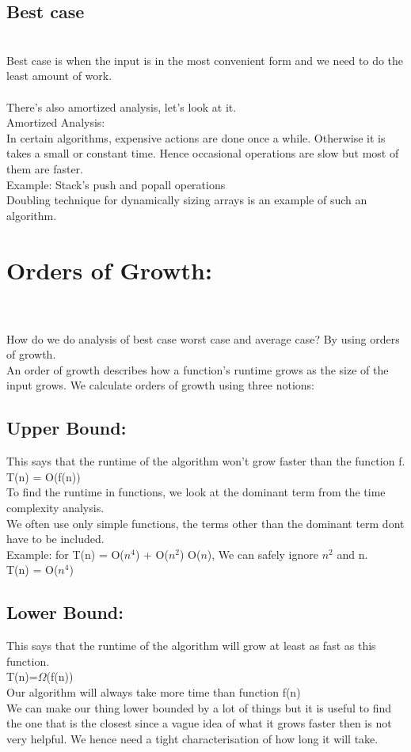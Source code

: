 \subsection{Best case}
\\ Best case is when the input is in the most convenient form and we need to do the least amount of work.
\\ 
\\There's also amortized analysis, let's look at it.
\\Amortized Analysis:
\\In certain algorithms, expensive actions are done once a while. Otherwise it is takes a small or constant time. Hence occasional operations are slow but most of them are faster.
\\Example: Stack's push and popall operations
\\Doubling technique for dynamically sizing arrays is an example of such an algorithm. 



\section{Orders of Growth:}
\\\\How do we do analysis of best case worst case and average case? By using orders of growth.
\\An order of growth describes how a function's runtime grows as the size of the input grows. We calculate orders of growth using three notions:
\subsection{Upper Bound:} This says that the runtime of the algorithm won't grow faster than the function f.
\\	T(n) = O(f(n))
\\	To find the runtime in functions, we look at the dominant term from the time complexity analysis.
\\	We often use only simple functions, the terms other than the dominant term dont have to be included.
\\ Example: for T(n) = O($n^4$) + O($n^2$) O($n$), We can safely ignore $n^2$ and n. 
\\ T(n) =  O($n^4$)
\subsection{Lower Bound:} This says that the runtime of the algorithm will grow at least as fast as this function.
\\	T(n)=$\Omega$(f(n))
\\	Our algorithm will always take more time than function f(n)
\\	We can make our thing lower bounded by a lot of things but it is useful to find the one that is the closest since a vague idea of what it grows faster then is not very helpful. We hence need a tight characterisation of how long it will take.
